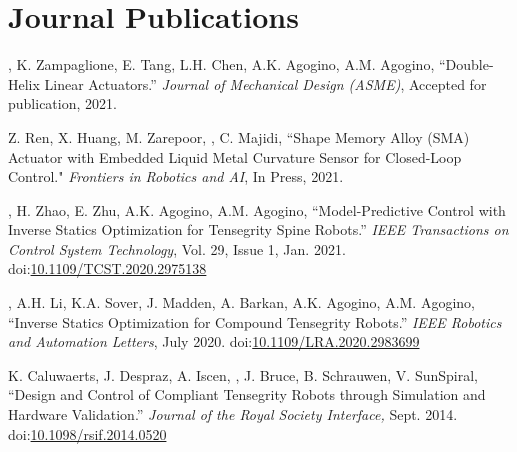 \documentclass[letterpaper]{deedy-resume} %
\newcommand\doilink[1]{\href{http://dx.doi.org/#1}{#1}}
\newcommand\doi[1]{doi:\doilink{#1}}
\begin{document}
{%

\section{Journal Publications}
\vspace{0.2cm}

\begin{etaremune}[itemsep=0.1cm]

\item \underline{{}}, K. Zampaglione, E. Tang, L.H. Chen, A.K. Agogino, A.M. Agogino, ``Double-Helix Linear Actuators.'' {\it Journal of Mechanical Design (ASME)}, Accepted for publication, 2021.

\item Z. Ren, X. Huang, M. Zarepoor, \underline{{}}, C. Majidi, ``Shape Memory Alloy (SMA) Actuator with Embedded Liquid Metal Curvature Sensor for Closed-Loop Control." {\it Frontiers in Robotics and AI}, In Press, 2021.

\item \underline{{}}, H. Zhao, E. Zhu, A.K. Agogino, A.M. Agogino, ``Model-Predictive Control with Inverse Statics Optimization for Tensegrity Spine Robots.'' {\it IEEE Transactions on Control System Technology}, Vol. 29, Issue 1, Jan. 2021. \doi{10.1109/TCST.2020.2975138}

\item \underline{{}}, A.H. Li, K.A. Sover, J. Madden, A. Barkan, A.K. Agogino, A.M. Agogino, ``Inverse Statics Optimization for Compound Tensegrity Robots.'' {\it IEEE Robotics and Automation Letters}, July 2020. \doi{10.1109/LRA.2020.2983699}

\item K. Caluwaerts, J. Despraz, A. Iscen, \underline{{}}, J. Bruce, B. Schrauwen, V. SunSpiral, ``Design and Control of Compliant Tensegrity Robots through Simulation and Hardware Validation.'' {\it Journal of the Royal Society Interface,} Sept. 2014. \doi{10.1098/rsif.2014.0520}

\end{etaremune}

}
\end{document}
